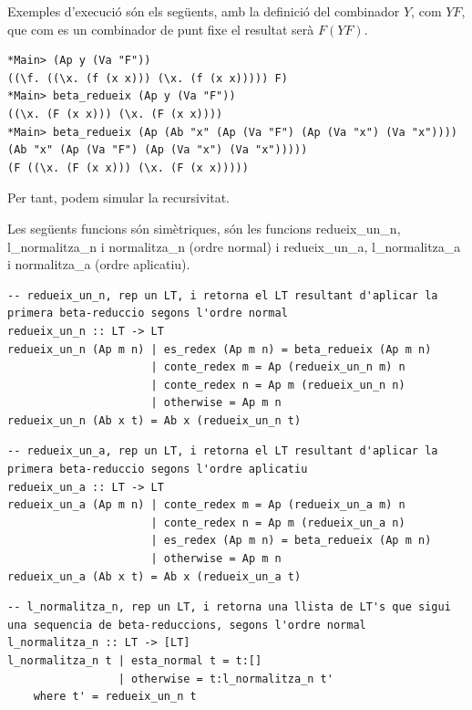 \documentclass[10pt,a4paper]{article}
\begin{document}
Exemples d'execució són els següents, amb la definició del combinador $Y$, com $Y F$, que com es un combinador de punt fixe el resultat serà $F (Y F)$.

\lstset{language=Haskell, breaklines=true, basicstyle=\footnotesize}
\begin{lstlisting}[frame=mystyle]
*Main> (Ap y (Va "F"))
((\f. ((\x. (f (x x))) (\x. (f (x x))))) F)
*Main> beta_redueix (Ap y (Va "F"))
((\x. (F (x x))) (\x. (F (x x))))
*Main> beta_redueix (Ap (Ab "x" (Ap (Va "F") (Ap (Va "x") (Va "x")))) (Ab "x" (Ap (Va "F") (Ap (Va "x") (Va "x")))))
(F ((\x. (F (x x))) (\x. (F (x x)))))
\end{lstlisting}

Per tant, podem simular la recursivitat.

\clearpage

Les següents funcions són simètriques, són les funcions redueix\_un\_n, l\_normalitza\_n i normalitza\_n (ordre normal) i redueix\_un\_a, l\_normalitza\_a i normalitza\_a (ordre aplicatiu).

\lstset{language=Haskell, breaklines=true, basicstyle=\footnotesize}
\begin{lstlisting}[frame=mystyle]
-- redueix_un_n, rep un LT, i retorna el LT resultant d'aplicar la primera beta-reduccio segons l'ordre normal
redueix_un_n :: LT -> LT
redueix_un_n (Ap m n) | es_redex (Ap m n) = beta_redueix (Ap m n)
                      | conte_redex m = Ap (redueix_un_n m) n
                      | conte_redex n = Ap m (redueix_un_n n)
                      | otherwise = Ap m n
redueix_un_n (Ab x t) = Ab x (redueix_un_n t)
\end{lstlisting}

\lstset{language=Haskell, breaklines=true, basicstyle=\footnotesize}
\begin{lstlisting}[frame=mystyle]
-- redueix_un_a, rep un LT, i retorna el LT resultant d'aplicar la primera beta-reduccio segons l'ordre aplicatiu
redueix_un_a :: LT -> LT
redueix_un_a (Ap m n) | conte_redex m = Ap (redueix_un_a m) n
                      | conte_redex n = Ap m (redueix_un_a n)
                      | es_redex (Ap m n) = beta_redueix (Ap m n)
                      | otherwise = Ap m n
redueix_un_a (Ab x t) = Ab x (redueix_un_a t)
\end{lstlisting}



\lstset{language=Haskell, breaklines=true, basicstyle=\footnotesize}
\begin{lstlisting}[frame=mystyle]
-- l_normalitza_n, rep un LT, i retorna una llista de LT's que sigui una sequencia de beta-reduccions, segons l'ordre normal
l_normalitza_n :: LT -> [LT]
l_normalitza_n t | esta_normal t = t:[]
                 | otherwise = t:l_normalitza_n t'
    where t' = redueix_un_n t
\end{lstlisting}
\end{document}
